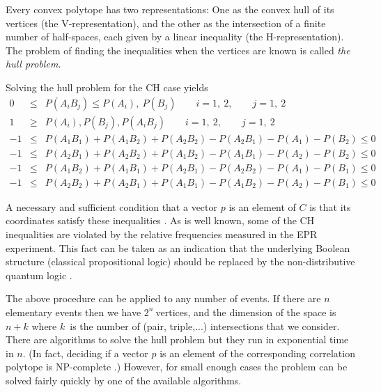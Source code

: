 Every convex polytope has  two
representations:
One as the convex hull of its vertices (the V-representation), and the other
as the intersection
of a finite number of half-spaces, each given by a linear inequality (the
H-representation).
The problem of finding the inequalities when the vertices are known is
called {\em the hull problem.}

Solving the hull problem for the CH case yields
\begin{eqnarray}
0&\leq & P(A_{i}B_{j})\leq P(A_{i}),\ P(B_{j}) \qquad  i=1,\ 2,\qquad  j=1,\ 2
\nonumber \\
1&\geq & P(A_{i}), P(B_{j}),P(A_{i}B_{j})\qquad i=1,\ 2,\qquad j=1,\ 2
\nonumber \\
-1&\leq& P(A_{1}B_{1})+P(A_{1}B_{2})+P(A_{2}B_{2})-P(A_{2}B_{1})-P(A_{1})-P(B_{2}) \leq 0
\nonumber \\
-1&\leq&  P(A_{2}B_{1})+P(A_{2}B_{2})+P(A_{1}B_{2})-P(A_{1}B_{1})-P(A_{2})-P(B_{2})\leq 0
\nonumber \\
-1&\leq&  P(A_{1}B_{2})+P(A_{1}B_{1})+P(A_{2}B_{1})-P(A_{2}B_{2})-P(A_{1})-P(B_{1})\leq 0
\nonumber \\
-1&\leq&  P(A_{2}B_{2})+P(A_{2}B_{1})+P(A_{1}B_{1})-P(A_{1}B_{2})-P(A_{2})-P(B_{1})\leq 0
\nonumber
\end{eqnarray}

A necessary and sufficient condition that a vector $p$ is an element of $C$
 is that its coordinates satisfy
these inequalities \cite{pitowsky}.
As is well known, some of the CH inequalities are
violated by the relative
frequencies measured in the EPR experiment. This fact can be taken as an
indication that
the underlying Boolean structure (classical propositional logic) should be
replaced by the
non-distributive quantum logic \cite{pitowsky,svozil-ql}.

The above procedure can be applied to any number of events. If there are $n$
elementary events then we have $2^{n}\ $vertices, and the dimension of the
space is $n+k$ where
$k$\ is the number of (pair, triple,...) intersections that we consider.
There are algorithms to
solve the hull problem but they run in exponential time in $n$.
(In fact,
deciding if a vector $p$
is an element of the corresponding correlation polytope is NP-complete \cite{Pit-91}.)
However, for small enough cases the problem can be solved fairly quickly by
one of the
available algorithms.

